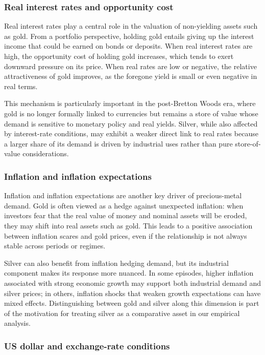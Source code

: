 \subsubsection{Real interest rates and opportunity cost}

Real interest rates play a central role in the valuation of non-yielding assets such as
gold. From a portfolio perspective, holding gold entails giving up the interest income that
could be earned on bonds or deposits. When real interest rates are high, the opportunity
cost of holding gold increases, which tends to exert downward pressure on its price. When
real rates are low or negative, the relative attractiveness of gold improves, as the
foregone yield is small or even negative in real terms.

This mechanism is particularly important in the post-Bretton Woods era, where gold is no
longer formally linked to currencies but remains a store of value whose demand is sensitive
to monetary policy and real yields. Silver, while also affected by interest-rate
conditions, may exhibit a weaker direct link to real rates because a larger share of its
demand is driven by industrial uses rather than pure store-of-value considerations.
\subsubsection{Inflation and inflation expectations}

Inflation and inflation expectations are another key driver of precious-metal demand. Gold
is often viewed as a hedge against unexpected inflation: when investors fear that the real
value of money and nominal assets will be eroded, they may shift into real assets such as
gold. This leads to a positive association between inflation scares and gold prices, even
if the relationship is not always stable across periods or regimes.

Silver can also benefit from inflation hedging demand, but its industrial component makes
its response more nuanced. In some episodes, higher inflation associated with strong
economic growth may support both industrial demand and silver prices; in others, inflation
shocks that weaken growth expectations can have mixed effects. Distinguishing between gold
and silver along this dimension is part of the motivation for treating silver as a
comparative asset in our empirical analysis.
\subsubsection{US dollar and exchange-rate conditions}


